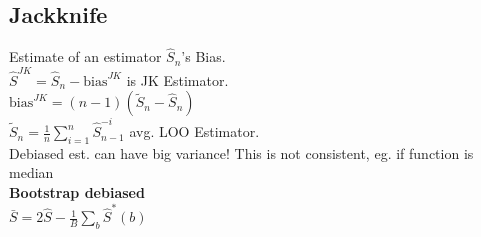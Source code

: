\subsection*{Jackknife}
Estimate of an estimator $\hat{S}_n$'s Bias.\\
$\hat{S}^{JK}=\hat{S}_n-\mathrm{bias}^{JK}$ is JK Estimator.\\
$\mathrm{bias}^{JK}{=}(n{-}1)(\tilde{S}_n{-}\hat{S}_n)$\\
$\tilde{S}_n{=}\frac{1}{n}\sum_{i=1}^n\hat{S}_{n{-}1}^{-i}$ avg. LOO Estimator. \\
Debiased est. can have big variance! This is not consistent, eg. if function is median\\
\textbf{Bootstrap debiased}\\ $\bar{S}{=}2\hat{S}{-}\frac{1}{B}\sum_b\hat{S}^*(b)$
%
